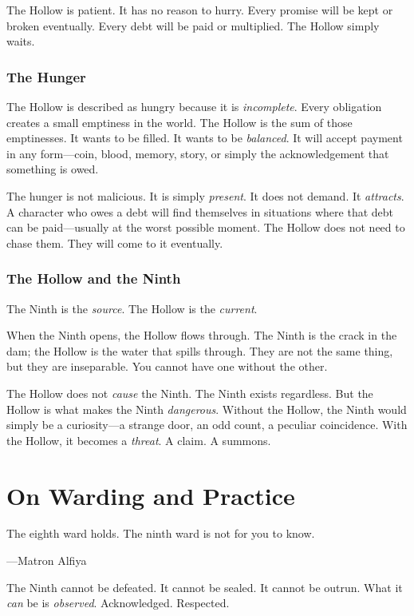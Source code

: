 \documentclass[11pt]{book}
\begin{document}
The Hollow is patient. It has no reason to hurry. Every promise will be kept or broken eventually. Every debt will be paid or multiplied. The Hollow simply waits.

\subsection{The Hunger}

The Hollow is described as hungry because it is \textit{incomplete}. Every obligation creates a small emptiness in the world. The Hollow is the sum of those emptinesses. It wants to be filled. It wants to be \textit{balanced}. It will accept payment in any form---coin, blood, memory, story, or simply the acknowledgement that something is owed.

The hunger is not malicious. It is simply \textit{present}. It does not demand. It \textit{attracts}. A character who owes a debt will find themselves in situations where that debt can be paid---usually at the worst possible moment. The Hollow does not need to chase them. They will come to it eventually.

\subsection{The Hollow and the Ninth}

The Ninth is the \textit{source}. The Hollow is the \textit{current}.

When the Ninth opens, the Hollow flows through. The Ninth is the crack in the dam; the Hollow is the water that spills through. They are not the same thing, but they are inseparable. You cannot have one without the other.

The Hollow does not \textit{cause} the Ninth. The Ninth exists regardless. But the Hollow is what makes the Ninth \textit{dangerous}. Without the Hollow, the Ninth would simply be a curiosity---a strange door, an odd count, a peculiar coincidence. With the Hollow, it becomes a \textit{threat}. A claim. A summons.

\chapter{On Warding and Practice}

\epigraph{The eighth ward holds. The ninth ward is not for you to know.}{---Matron Alfiya}

The Ninth cannot be defeated. It cannot be sealed. It cannot be outrun. What it \textit{can} be is \textit{observed}. Acknowledged. Respected.
\end{document}
